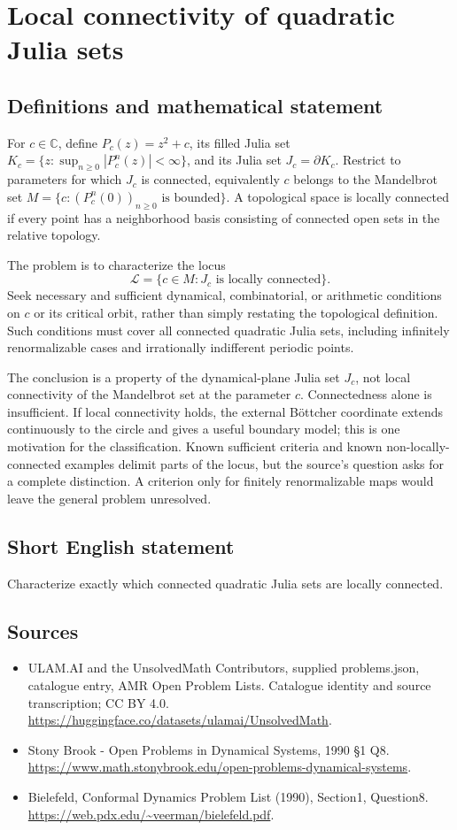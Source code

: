 \documentclass[11pt,a4paper]{article}
\begin{document}
\section*{Local connectivity of quadratic Julia sets}\label{statement}

\subsection{Definitions and mathematical statement}
For $c\in\mathbb C$, define $P_c(z)=z^2+c$, its filled Julia set
$K_c=\{z:\sup_{n\ge0}|P_c^n(z)|<\infty\}$, and its Julia set
$J_c=\partial K_c$. Restrict to parameters for which $J_c$ is
connected, equivalently $c$ belongs to the Mandelbrot set
$M=\{c:(P_c^n(0))_{n\ge0}\text{ is bounded}\}$.
A topological space is locally connected if every point has a
neighborhood basis consisting of connected open sets in the
relative topology.

The problem is to characterize the locus
\[
 \mathcal L=\{c\in M:J_c\text{ is locally connected}\}.
\]
Seek necessary and sufficient dynamical, combinatorial, or arithmetic
conditions on $c$ or its critical orbit, rather than simply restating
the topological definition. Such conditions must cover all connected
quadratic Julia sets, including infinitely renormalizable cases and
irrationally indifferent periodic points.

The conclusion is a property of the dynamical-plane Julia set
$J_c$, not local connectivity of the Mandelbrot set at the parameter
$c$. Connectedness alone is insufficient. If local connectivity
holds, the external Böttcher coordinate extends continuously to
the circle and gives a useful boundary model; this is one
motivation for the classification. Known sufficient criteria and
known non-locally-connected examples delimit parts of the locus,
but the source's question asks for a complete distinction. A
criterion only for finitely renormalizable maps would leave the
general problem unresolved.
\subsection{Short English statement}
Characterize exactly which connected quadratic Julia sets are locally connected.
\subsection{Sources}
\begin{itemize}
\item[S1] ULAM.AI and the UnsolvedMath Contributors, supplied problems.json, catalogue entry, AMR Open Problem Lists. Catalogue identity and source transcription; CC BY 4.0.
\url{https://huggingface.co/datasets/ulamai/UnsolvedMath}.
\item[S2] Stony Brook - Open Problems in Dynamical Systems, 1990 §1 Q8. 
\url{https://www.math.stonybrook.edu/open-problems-dynamical-systems}.
\item[S3] Bielefeld, Conformal Dynamics Problem List (1990), Section1, Question8.
\url{https://web.pdx.edu/~veerman/bielefeld.pdf}.
\end{itemize}
\end{document}
